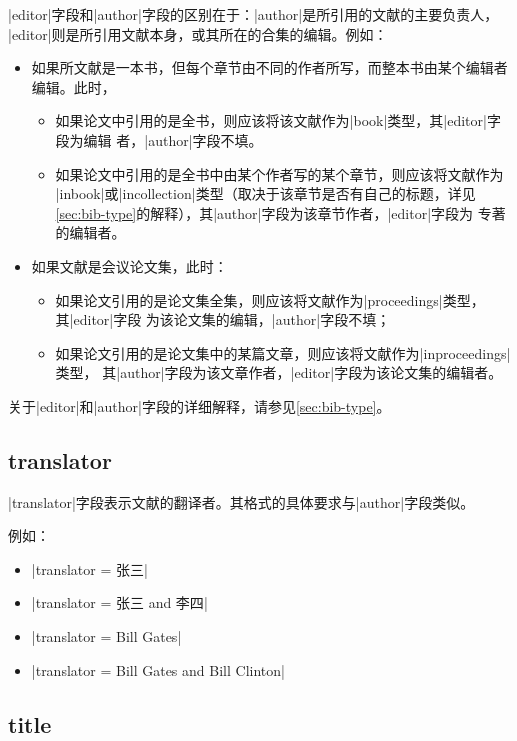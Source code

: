 |editor|字段和|author|字段的区别在于：|author|是所引用的文献的主要负责人，
|editor|则是所引用文献本身，或其所在的合集的编辑。例如：
\begin{itemize}
\item 如果所文献是一本书，但每个章节由不同的作者所写，而整本书由某个编辑者编辑。此时，
  \begin{itemize}
  \item 如果论文中引用的是全书，则应该将该文献作为|book|类型，其|editor|字段为编辑
    者，|author|字段不填。
  \item 如果论文中引用的是全书中由某个作者写的某个章节，则应该将文献作为
    |inbook|或|incollection|类型（取决于该章节是否有自己的标题，详见
    \ref{sec:bib-type}的解释），其|author|字段为该章节作者，|editor|字段为
    专著的编辑者。
  \end{itemize}
\item 如果文献是会议论文集，此时：
  \begin{itemize}
  \item 如果论文引用的是论文集全集，则应该将文献作为|proceedings|类型，其|editor|字段
    为该论文集的编辑，|author|字段不填；
  \item 如果论文引用的是论文集中的某篇文章，则应该将文献作为|inproceedings|类型，
    其|author|字段为该文章作者，|editor|字段为该论文集的编辑者。
  \end{itemize}
\end{itemize}

关于|editor|和|author|字段的详细解释，请参见\ref{sec:bib-type}。

\subsection{translator}\label{subsec:translator}

|translator|字段表示文献的翻译者。其格式的具体要求与|author|字段类似。

例如：
\begin{itemize}
\item |translator = {张三}|
\item |translator = {张三 and 李四}|
\item |translator = {Bill Gates}|
\item |translator = {Bill Gates and Bill Clinton}|
\end{itemize}

\subsection{title}\label{subsec:bibfield-title}

